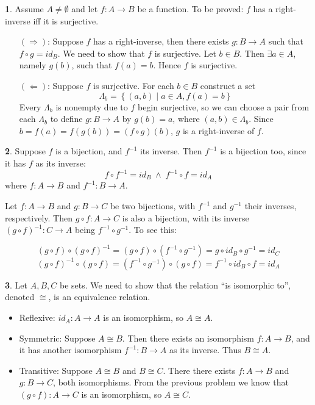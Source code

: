 \documentclass{article}
\theoremstyle{definition}
\newcommand{\AND}{\;\wedge\;}
\newcommand{\set}[1]{\left\{#1\right\}}
\theoremstyle{definition}
\theoremstyle{definition}
\newtheorem{solution-internal}{}[subsection]
\newenvironment{solution}{
  \medskip
  \begin{solution-internal}
}{
  \end{solution-internal}
}
\begin{document}
\begin{solution}
Assume $A \neq \emptyset$ and let $f \colon A \to B$ be a function. To be proved: $f$ has a right-inverse iff it is surjective.
\begin{itemize}
  \item[$(\Rightarrow)$:] Suppose $f$ has a right-inverse, then there exists $g \colon B \to A$ such that $f \circ g = id_B$. We need to show that $f$ is surjective. Let $b \in B$. Then $\exists a \in A$, namely $g(b)$, such that $f(a) = b$. Hence $f$ is surjective.
\item[$(\Leftarrow)$:] Suppose $f$ is surjective. For each $b \in B$ construct a set
\[ \Lambda_b = \set{(a,b) \mid a \in A, f(a) = b} \]
Every $\Lambda_b$ is nonempty due to $f$ begin surjective, so we can choose a
pair from each $\Lambda_b$ to define $g \colon B \to A$ by $g(b) = a$, where
$(a,b) \in \Lambda_b$. Since $b = f(a) = f(g(b)) = (f \circ g)(b)$, $g$ is a
right-inverse of $f$.
\end{itemize}
\end{solution}

\begin{solution}
Suppose $f$ is a bijection, and $f^{-1}$ its inverse. Then $f^{-1}$ is a bijection too, since it has $f$ as its inverse:
\[f \circ f^{-1} = id_B \AND f^{-1} \circ f = id_A \]
where $f \colon A \to B$ and $f^{-1} \colon B \to A$.
\end{solution}
Let $f\colon A \to B$ and $g\colon B \to C$ be two bijections, with $f^{-1}$
and $g^{-1}$ their inverses, respectively. Then $g \circ f \colon A \to C$ is
also a bijection, with its inverse $(g\circ f)^{-1}\colon C \to A$ being $f^{-1} \circ g^{-1}$. To see this:

\[(g \circ f)\circ {(g\circ f)}^{-1} = (g\circ f) \circ (f^{-1}\circ g^{-1}) = g \circ id_B \circ g^{-1} = id_C \]
\[{(g\circ f)}^{-1}\circ (g \circ f) = (f^{-1}\circ g^{-1}) \circ (g\circ f) = f^{-1} \circ id_B \circ f = id_A \]

\begin{solution}
Let $A,B,C$ be sets. We need to show that the relation ``is isomorphic
to'', denoted $\cong$, is an equivalence relation.
\begin{itemize}
\item Reflexive: $id_A\colon A \to A$ is an isomorphism, so $A\cong A$.
\item Symmetric: Suppose $A \cong B$. Then there exists an isomorphism $f\colon A \to B$, and it has another isomorphism $f^{-1}\colon B \to A$ as its inverse. Thus $B\cong A$.
\item Transitive: Suppose $A\cong B$ and $B\cong C$. There there exists $f\colon A \to B$ and $g\colon B \to C$, both isomorphisms. From the previous problem we know that $(g \circ f)\colon A \to C$ is an isomorphism, so $A \cong C$.
\end{itemize}
\end{solution}
\end{document}
